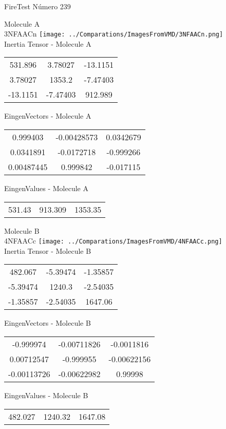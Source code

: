 \vtab[-2cm]
\begin{center}
{\large FireTest \tab Número 239}
\end{center}
\begin{multicols}{2}
\begin{center}

Molecule A \\ 
3NFAACn
\texttt{[image: ../Comparations/ImagesFromVMD/3NFAACn.png]}
\\
Inertia Tensor - Molecule A \\
\vtab

\begin{tabular}{|c c c|}
531.896	 & 	3.78027	 & 	-13.1151	 \\
3.78027	 & 	1353.2	 & 	-7.47403	 \\
-13.1151	 & 	-7.47403	 & 	912.989
\end{tabular}

\vtab
 EingenVectors - Molecule A     \\
\vtab
\begin{tabular}{|c c c|}
0.999403	 & 	-0.00428573	 & 	0.0342679	 \\
0.0341891	 & 	-0.0172718	 & 	-0.999266	 \\
0.00487445	 & 	0.999842	 & 	-0.017115
\end{tabular}

\vtab
 EingenValues - Molecule A     \\
\vtab
\begin{tabular}{|c c c|}
531.43	 & 	913.309	 & 	1353.35	 \\
\end{tabular}
\columnbreak

Molecule B \\ 
4NFAACc
\texttt{[image: ../Comparations/ImagesFromVMD/4NFAACc.png]}
\\
Inertia Tensor - Molecule B \\
\vtab

\begin{tabular}{|c c c|}
482.067	 & 	-5.39474	 & 	-1.35857	 \\
-5.39474	 & 	1240.3	 & 	-2.54035	 \\
-1.35857	 & 	-2.54035	 & 	1647.06
\end{tabular}

\vtab
 EingenVectors - Molecule B     \\
\vtab
\begin{tabular}{|c c c|}
-0.999974	 & 	-0.00711826	 & 	-0.0011816	 \\
0.00712547	 & 	-0.999955	 & 	-0.00622156	 \\
-0.00113726	 & 	-0.00622982	 & 	0.99998
\end{tabular}

\vtab
 EingenValues - Molecule B     \\
\vtab
\begin{tabular}{|c c c|}
482.027	 & 	1240.32	 & 	1647.08	 \\
\end{tabular}

\end{center}
\end{multicols}
